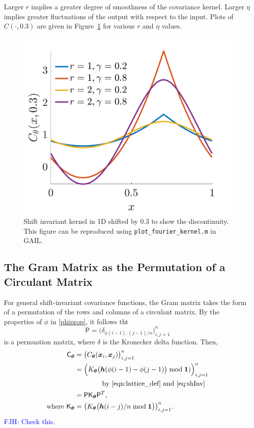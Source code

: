 \documentclass[twocolumn]{svjour3}          %
\newcommand{\bm}[1]{\boldsymbol{#1}}
\newcommand{\vtheta}{{\bm{\theta}}}
\newcommand{\vh}{\bm{h}}
\newcommand{\vx}{\bm{x}}
\newcommand{\vone}{\bm{1}}
\newcommand{\mC}{\mathsf{C}}
\newcommand{\mP}{\mathsf{P}}
\newcommand{\mK}{\mathsf{K}}
\newcommand{\code}[1]{\texttt{#1}}
\newcommand\figref{Figure~\ref}
\newcommand{\FJHNote}[1]{{\textcolor{blue}{FJH: #1}}}
\begin{document}
Larger $r$ implies a greater degree of smoothness of the covariance kernel.  Larger $\eta$ implies greater fluctuations of the output with respect to the input.  Plots of $C(\cdot, 0.3)$ are given in \figref{fig:fourierkernel-dim1} for various $r$ and $\eta$ values.

\begin{figure}
	\centering
	\includegraphics[width=0.9\linewidth]{"fourier_kernel_dim_1"}
	\caption[Fourier kernel]{Shift invariant kernel in 1D shifted by 0.3 to show the discontinuity. This figure can be reproduced using \code{plot\_fourier\_kernel.m} in GAIL. }
	\label{fig:fourierkernel-dim1}
\end{figure}

\subsection{The Gram Matrix as the Permutation of a Circulant Matrix}
For general shift-invariant covariance functions, the Gram matrix takes the form of a permutation of the rows and columns of a circulant matrix. By the properties of $\phi$ in \eqref{phiprop}, it follows tht
\begin{equation} \label{PermMat}
    \mP = \bigl( \delta_{\phi(i-1), (j-1)/n}  \bigr)_{i,j=1}^n
\end{equation}
is a permuation matrix, where $\delta$ is the Kronecker delta function.  Then,
\begin{align}
\nonumber
\mC_\vtheta &= \bigl ( C_\vtheta(\vx_i, \vx_j) \bigr)_{i, j = 1}^n \\
\nonumber
& = \Bigl ( K_\vtheta \bigl(\vh(\phi(i-1) - \phi(j-1) \bigr) \bmod \vone ) \Bigr)_{i, j = 1}^n \\
\nonumber
& \qquad \qquad  \text{by \eqref{eqn:lattice_def} and \eqref{eq:shInv}}  \\
& = \mP \mK_{\vtheta}  \mP^T,  \label{shInvKernGramMatrix} \\
\nonumber 
\text{where } \mK_{\vtheta} &= \bigl ( K_\vtheta \bigl (\vh (i-j)/n \bmod \vone \bigr ) \bigr)_{i, j = 1}^n.
\end{align}
\FJHNote{Check this.}
\end{document}
